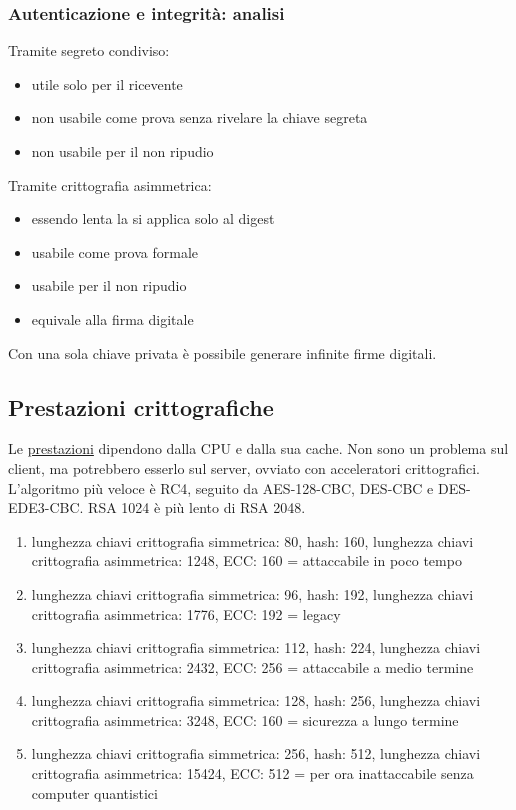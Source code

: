 \documentclass[11pt]{article}
\begin{document}
\subsubsection{Autenticazione e integrità: analisi}
Tramite segreto condiviso:
\begin{itemize}
    \item utile solo per il ricevente
    \item non usabile come prova senza rivelare la chiave segreta
    \item non usabile per il non ripudio
\end{itemize}
Tramite crittografia asimmetrica:
\begin{itemize}
    \item essendo lenta la si applica solo al digest 
    \item usabile come prova formale
    \item usabile per il non ripudio
    \item equivale alla firma digitale
\end{itemize}
Con una sola chiave privata è possibile generare infinite firme digitali.
\subsection{Prestazioni crittografiche}
Le \href{https://www.cse.wustl.edu/~jain/cse567-06/ftp/encryption_perf/}{prestazioni} dipendono dalla CPU e dalla sua cache. Non sono un problema sul client, ma potrebbero esserlo sul server,
ovviato con acceleratori crittografici.
L'algoritmo più veloce è RC4, seguito da AES-128-CBC, DES-CBC e DES-EDE3-CBC. RSA 1024 è più lento di RSA 2048.
\begin{enumerate}
    \item lunghezza chiavi crittografia simmetrica: 80, hash: 160, lunghezza chiavi crittografia asimmetrica: 1248, 
    ECC: 160 = attaccabile in poco tempo 
    \item lunghezza chiavi crittografia simmetrica: 96, hash: 192, lunghezza chiavi crittografia asimmetrica: 1776, 
    ECC: 192 = legacy
    \item lunghezza chiavi crittografia simmetrica: 112, hash: 224, lunghezza chiavi crittografia asimmetrica: 2432, 
    ECC: 256 = attaccabile a medio termine 
    \item lunghezza chiavi crittografia simmetrica: 128, hash: 256, lunghezza chiavi crittografia asimmetrica: 3248, 
    ECC: 160 = sicurezza a lungo termine
    \item lunghezza chiavi crittografia simmetrica: 256, hash: 512, lunghezza chiavi crittografia asimmetrica: 15424, 
    ECC: 512 = per ora inattaccabile senza computer quantistici
\end{enumerate}
\end{document}
